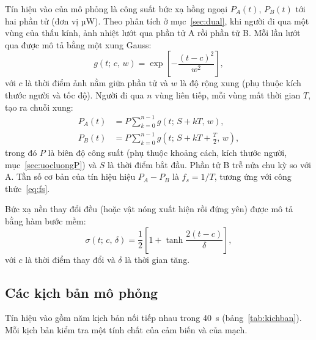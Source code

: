 Tín hiệu vào của mô phỏng là công suất bức xạ hồng ngoại $P_A(t)$, $P_B(t)$ tới hai phần tử (đơn vị µW). Theo phân tích ở mục~\ref{sec:dual}, khi người đi qua một vùng của thấu kính, ảnh nhiệt lướt qua phần tử A rồi phần tử B. Mỗi lần lướt qua được mô tả bằng một xung Gauss:
\begin{equation}
  g(t;\,c,\,w) = \exp\!\left[-\frac{(t-c)^2}{w^2}\right],
  \label{eq:gauss}
\end{equation}
với $c$ là thời điểm ảnh nằm giữa phần tử và $w$ là độ rộng xung (phụ thuộc kích thước người và tốc độ). Người đi qua $n$ vùng liên tiếp, mỗi vùng mất thời gian $T$, tạo ra chuỗi xung:
\begin{align}
  P_A(t) &= P\sum_{k=0}^{n-1} g(t;\,S+kT,\,w), \label{eq:PA}\\
  P_B(t) &= P\sum_{k=0}^{n-1} g\!\left(t;\,S+kT+\tfrac{T}{2},\,w\right), \label{eq:PB}
\end{align}
trong đó $P$ là biên độ công suất (phụ thuộc khoảng cách, kích thước người, mục~\ref{sec:uocluongP}) và $S$ là thời điểm bắt đầu. Phần tử B trễ nửa chu kỳ so với A. Tần số cơ bản của tín hiệu hiệu $P_A - P_B$ là $f_s = 1/T$, tương ứng với công thức~\eqref{eq:fs}.

Bức xạ nền thay đổi đều (hoặc vật nóng xuất hiện rồi đứng yên) được mô tả bằng hàm bước mềm:
\begin{equation}
  \sigma(t;\,c,\,\delta) = \frac{1}{2}\left[1+\tanh\frac{2(t-c)}{\delta}\right],
  \label{eq:sstep}
\end{equation}
với $c$ là thời điểm thay đổi và $\delta$ là thời gian tăng.

\subsection{Các kịch bản mô phỏng}

Tín hiệu vào gồm năm kịch bản nối tiếp nhau trong 40~s (bảng~\ref{tab:kichban}). Mỗi kịch bản kiểm tra một tính chất của cảm biến và của mạch.

